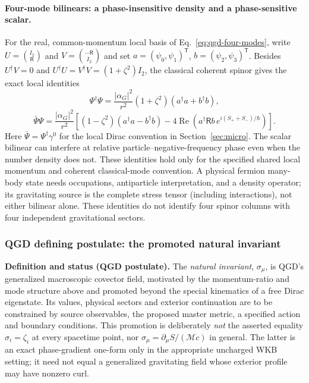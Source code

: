 \documentclass[11pt,a4paper]{article}
\begin{document}
\paragraph{Four-mode bilinears: a phase-insensitive density and a phase-sensitive scalar.}
For the real, common-momentum local basis of Eq.~\eqref{eq:qgd-four-modes}, write $U=\binom{I_2}{\mathsf R}$ and $V=\binom{-\mathsf R}{I_2}$ and set $a=(\psi_0,\psi_1)^{\mathsf T}$, $b=(\psi_2,\psi_3)^{\mathsf T}$.  Besides $U^\dagger V=0$ and $U^\dagger U=V^\dagger V=(1+\zeta^2)I_2$, the classical coherent spinor gives the exact local identities
\begin{equation}\label{eq:qgd-fourmode-density}
\Psi^\dagger\Psi=\frac{|\alpha_G|^2}{r^2}(1+\zeta^2)(a^\dagger a+b^\dagger b),
\end{equation}
\begin{equation}\label{eq:qgd-fourmode-scalar}
\bar\Psi\Psi=\frac{|\alpha_G|^2}{r^2}
\left[(1-\zeta^2)(a^\dagger a-b^\dagger b)
-4\operatorname{Re}\left(a^\dagger\mathsf R b\,e^{i(S_++S_-)/\hbar}\right)\right].
\end{equation}
Here $\bar\Psi=\Psi^\dagger\gamma^0$ for the local Dirac convention in Section~\ref{sec:micro}.  The scalar bilinear can interfere at relative particle--negative-frequency phase even when the number density does not.  These identities hold only for the specified shared local momentum and coherent classical-mode convention.  A physical fermion many-body state needs occupations, antiparticle interpretation, and a density operator; its gravitating source is the complete stress tensor (including interactions), not either bilinear alone.  These identities do not identify four spinor columns with four independent gravitational sectors.

\subsubsection{QGD defining postulate: the promoted natural invariant}\label{sec:qgd-promotion}
\noindent\textbf{Definition and status (QGD postulate).}
The \emph{natural invariant}, $\sigma_\mu$, is QGD's generalized macroscopic covector field, motivated by the momentum-ratio and mode structure above and promoted beyond the special kinematics of a free Dirac eigenstate. Its values, physical sectors and exterior continuation are to be constrained by source observables, the proposed master metric, a specified action and boundary conditions. This promotion is deliberately \emph{not} the asserted equality $\sigma_i=\zeta_i$ at every spacetime point, nor $\sigma_\mu=\partial_\mu S/(\mathcal Mc)$ in general. The latter is an exact phase-gradient one-form only in the appropriate uncharged WKB setting; it need not equal a generalized gravitating field whose exterior profile may have nonzero curl.
\end{document}
